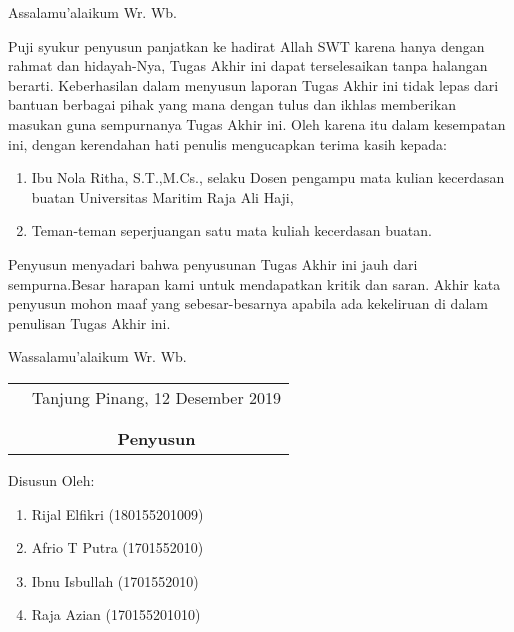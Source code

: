 \documentclass{jtetiskripsi}
\begin{document}
\cover


\preface
Assalamu'alaikum Wr. Wb.

\vspace{0.5cm}

Puji syukur penyusun panjatkan ke hadirat Allah SWT karena hanya dengan rahmat dan hidayah-Nya, Tugas Akhir ini dapat terselesaikan tanpa halangan berarti. Keberhasilan dalam menyusun laporan Tugas Akhir ini tidak lepas dari bantuan berbagai pihak yang mana dengan tulus dan ikhlas memberikan masukan guna sempurnanya Tugas Akhir ini. Oleh karena itu dalam kesempatan ini, dengan kerendahan hati penulis mengucapkan terima kasih kepada:

\begin{enumerate}
\item{Ibu Nola Ritha, S.T.,M.Cs., selaku Dosen pengampu mata kulian kecerdasan buatan Universitas Maritim Raja Ali Haji},
\item Teman-teman seperjuangan satu mata kuliah kecerdasan buatan.

\end{enumerate}


Penyusun menyadari bahwa penyusunan Tugas Akhir ini jauh dari sempurna.Besar harapan kami untuk mendapatkan kritik dan saran. Akhir kata penyusun mohon maaf yang sebesar-besarnya apabila ada kekeliruan di dalam penulisan Tugas Akhir ini.

\vspace{0.5cm}

Wassalamu'alaikum Wr. Wb.

\begin{tabular}{p{7.5cm}c}
&Tanjung Pinang, 12 Desember 2019\\
&\\
&\\
&\textbf{Penyusun}
\end{tabular}

\newpage
\noindent Disusun Oleh:
\begin{enumerate}
	\item Rijal Elfikri (180155201009)
	\item Afrio T Putra (1701552010)
	\item Ibnu Isbullah (1701552010)
	\item Raja Azian (170155201010)
\end{enumerate}
\end{document}
